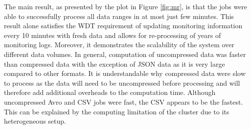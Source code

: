 
The main result, as presented by the plot in Figure \ref{fig:mr}, is that the jobs were able to successfully process all data ranges in at most just few minutes. This result alone satisfies the WDT requirement of updating monitoring information every 10 minutes with fresh data and allows for re-processing of years of monitoring logs. Moreover, it demonstrates the scalability of the system over different data volumes.
In general, computation of uncompressed data was faster than compressed data with the exception of JSON data as it is very large compared to other formats. It is understandable why compressed data were slow to process as the data will need to be uncompressed before processing and will therefore add additional overheads to the computation time. Although uncompressed Avro and CSV jobs were fast, the CSV appears to be the fastest.
This can be explained by the computing limitation of the cluster due to its heterogeneous setup.

